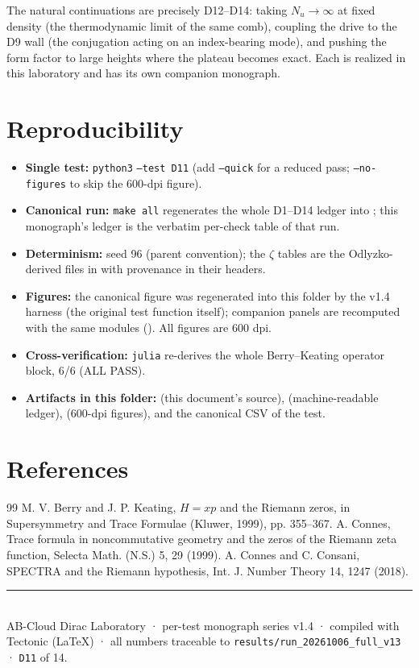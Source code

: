 \documentclass[11pt,a4paper]{article}
\begin{document}
The natural continuations are precisely D12--D14: taking $N_u \to \infty$ at fixed density (the thermodynamic limit of the same comb), coupling the drive to the D9 wall (the conjugation acting on an index-bearing mode), and pushing the form factor to large heights where the plateau becomes exact. Each is realized in this laboratory and has its own companion monograph.

\section{Reproducibility}
\begin{itemize}[leftmargin=1.2em, itemsep=0.15em]
\item \textbf{Single test:} \texttt{python3}  \texttt{--test D11} (add \texttt{--quick} for a reduced pass; \texttt{--no-figures} to skip the 600-dpi figure).
\item \textbf{Canonical run:} \texttt{make all} regenerates the whole D1--D14 ledger into ; this monograph's ledger is the verbatim per-check table of that run.
\item \textbf{Determinism:} seed 96 (parent convention); the $\zeta$ tables are the Odlyzko-derived files in  with provenance in their headers.
\item \textbf{Figures:} the canonical figure was regenerated into this folder by the v1.4 harness (the original test function itself); companion panels are recomputed with the same modules (). All figures are 600 dpi.
\item \textbf{Cross-verification:} \texttt{julia}  re-derives the whole Berry--Keating operator block, 6/6 (ALL PASS).
\item \textbf{Artifacts in this folder:}  (this document's source),  (machine-readable ledger),  (600-dpi figures), and the canonical CSV of the test.
\end{itemize}

\section*{References}
\begin{thebibliography}{99}\small
{} M. V. Berry and J. P. Keating, $H = xp$ and the Riemann zeros, in Supersymmetry and Trace Formulae (Kluwer, 1999), pp. 355--367.
 A. Connes, Trace formula in noncommutative geometry and the zeros of the Riemann zeta function, Selecta Math. (N.S.) 5, 29 (1999).
 A. Connes and C. Consani, SPECTRA and the Riemann hypothesis, Int. J. Number Theory 14, 1247 (2018).
\end{thebibliography}

\vfill
\noindent\rule{\textwidth}{0.4pt}\\[0.2em]
{\footnotesize\color{labgray} AB-Cloud Dirac Laboratory · per-test monograph series v1.4 · compiled with Tectonic (LaTeX) · all numbers traceable to \texttt{results/run\_20261006\_full\_v13} · \texttt{D11} of 14.}
\end{document}
